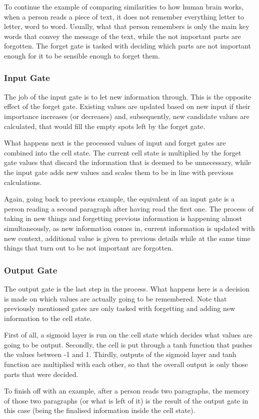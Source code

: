             To continue the example of comparing similarities to how human brain works, when a person reads a piece of text, it does not remember everything letter to letter, word to word. Usually, what that person remembers is only the main key words that convey the message of the text, while the not important parts are forgotten. The forget gate is tasked with deciding which parts are not important enough for it to be sensible enough to forget them.
            
        \subsubsection{Input Gate}
            The job of the input gate is to let new information through. This is the opposite effect of the forget gate. Existing values are updated based on new input if their importance increases (or decreases) and, subsequently, new candidate values are calculated, that would fill the empty spots left by the forget gate.
            
            What happens next is the processed values of input and forget gates are combined into the cell state. The current cell state is multiplied by the forget gate values that discard the information that is deemed to be unnecessary, while the input gate adds new values and scales them to be in line with previous calculations.
            
            Again, going back to previous example, the equivalent of an input gate is a person reading a second paragraph after having read the first one. The process of taking in new things and forgetting previous information is happening almost simultaneously, as new information comes in, current information is updated with new context, additional value is given to previous details while at the same time things that turn out to be not important are forgotten.
            
        \subsubsection{Output Gate}
            The output gate is the last step in the process. What happens here is a decision is made on which values are actually going to be remembered. Note that previously mentioned gates are only tasked with forgetting and adding new information to the cell state.
            
            First of all, a sigmoid layer is run on the cell state which decides what values are going to be output. Secondly, the cell is put through a tanh function that pushes the values between -1 and 1. Thirdly, outputs of the sigmoid layer and tanh function are multiplied with each other, so that the overall output is only those parts that were decided.
            
            To finish off with an example, after a person reads two paragraphs, the memory of those two paragraphs (or what is left of it) is the result of the output gate in this case (being the finalised information inside the cell state).